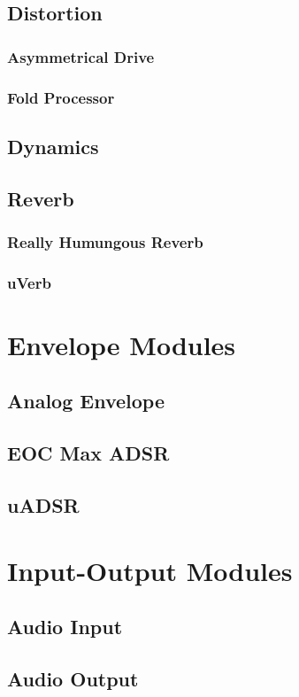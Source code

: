 \documentclass[11pt]{book}
\begin{document}
\section{Distortion}
\subsection{Asymmetrical Drive}
\subsection{Fold Processor}
\section{Dynamics}
\section{Reverb}
\subsection{Really Humungous Reverb}
\subsection{uVerb}

\chapter{Envelope Modules}
\section{Analog Envelope}
\section{EOC Max ADSR}
\section{uADSR}

\chapter{Input-Output Modules}
\section{Audio Input}
\section{Audio Output}
\end{document}
